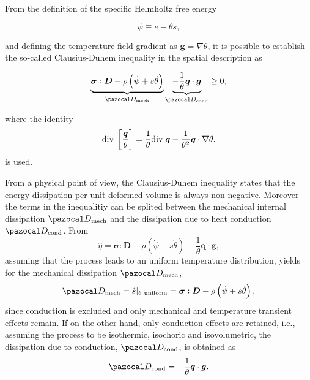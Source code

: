 From the definition of the specific Helmholtz free energy
\begin{highlight}
\begin{equation}
    \psi \equiv e -\theta s,
\end{equation}
\end{highlight}
and defining the temperature field gradient as $\bm g=\nabla \theta$, it is possible to establish the so-called Clausius-Duhem inequality in the spatial description as
\begin{highlight}
    \begin{equation}
        \underbrace{\mat \sigma:\mat D - \rho\left(\dot \psi +s\dot \theta\right)}_{\pazocal D_\text{mech}} \underbrace{-\frac{1}{\theta}\vect q\cdot \vect g }_{\pazocal D_\text{cond}}\geq 0, \label{eq:clasius_duhem_eq}
    \end{equation}
\end{highlight}
where the identity
\begin{equation}
    \text{div}\;\left[\frac{\bm{q}}{\theta}\right] =\frac{1}{\theta}\text{div}\;\bm{q} -\frac{1}{\theta^2}\bm{q}\cdot \nabla \theta.
\end{equation}
is used.

From a physical point of view, the Clausius-Duhem inequality states that the energy dissipation per unit deformed volume is always non-negative.
Moreover the terms in the inequalitiy can be splited between the mechanical internal dissipation \(\pazocal D_\text{mech}\) and the dissipation due to heat conduction \(\pazocal D_\text{cond}\).
From
\begin{equation}
\hat \eta = \bm \sigma :\bm D - \rho \left(\dot \psi  +s \dot \theta\right) -\frac{1}{\theta}\bm q\cdot\bm g,
\end{equation}
assuming that the process leads to an uniform temperature distribution, yields for the mechanical dissipation \(\pazocal D_\text{mech}\),
\begin{equation}
\pazocal D_\text{mech} = \hat{s}|_{\text{$\theta$ uniform} }= \bm \sigma:\bm D - \rho \left(\dot \psi + s \dot \theta\right),
\end{equation}
since conduction is excluded and only mechanical and temperature transient effects remain.
If on the other hand, only conduction effects are retained, i.e., assuming the process to be isothermic, isochoric and isovolumetric, the dissipation due to conduction, \(\pazocal D_\text{cond}\), is obtained as
\begin{equation}
\pazocal D_\text{cond} = - \frac{1}{\theta} \bm q\cdot \bm g.
\end{equation}

